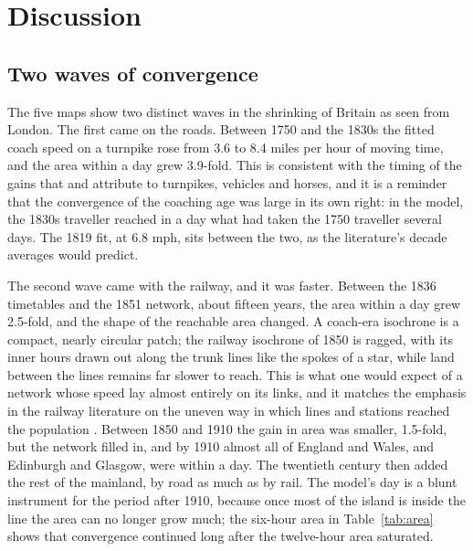 \documentclass[11pt,a4paper]{article}
\begin{document}
\section{Discussion}\label{sec:disc}
\subsection{Two waves of convergence}
The five maps show two distinct waves in the shrinking of Britain as seen from London. The first came on the roads. Between 1750 and the 1830s the fitted coach speed on a turnpike rose from 3.6 to 8.4 miles per hour of moving time, and the area within a day grew 3.9-fold. This is consistent with the timing of the gains that \citet{gerhold2014} and \citet{bogart2005} attribute to turnpikes, vehicles and horses, and it is a reminder that the convergence of the coaching age was large in its own right: in the model, the 1830s traveller reached in a day what had taken the 1750 traveller several days. The 1819 fit, at 6.8 mph, sits between the two, as the literature's decade averages would predict.

The second wave came with the railway, and it was faster. Between the 1836 timetables and the 1851 network, about fifteen years, the area within a day grew 2.5-fold, and the shape of the reachable area changed. A coach-era isochrone is a compact, nearly circular patch; the railway isochrone of 1850 is ragged, with its inner hours drawn out along the trunk lines like the spokes of a star, while land between the lines remains far slower to reach. This is what one would expect of a network whose speed lay almost entirely on its links, and it matches the emphasis in the railway literature on the uneven way in which lines and stations reached the population \citep{gregory2010,bogart2022}. Between 1850 and 1910 the gain in area was smaller, 1.5-fold, but the network filled in, and by 1910 almost all of England and Wales, and Edinburgh and Glasgow, were within a day. The twentieth century then added the rest of the mainland, by road as much as by rail. The model's day is a blunt instrument for the period after 1910, because once most of the island is inside the line the area can no longer grow much; the six-hour area in Table~\ref{tab:area} shows that convergence continued long after the twelve-hour area saturated.
\end{document}
